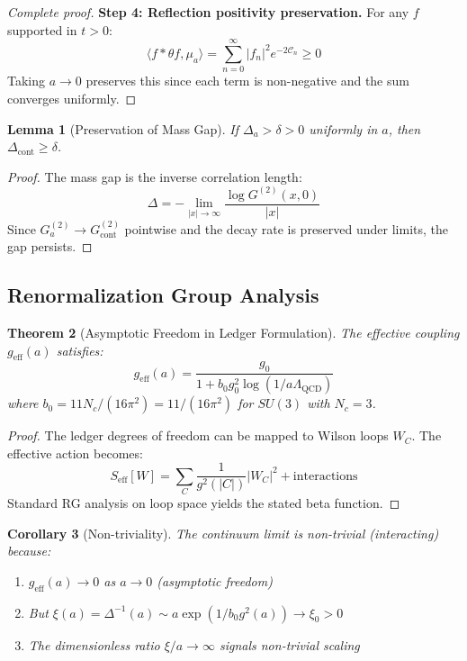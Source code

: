 \documentclass[11pt]{article}
\numberwithin{equation}{section}
\newtheorem{theorem}{Theorem}[section]
\newtheorem{lemma}[theorem]{Lemma}
\newtheorem{corollary}[theorem]{Corollary}
\theoremstyle{definition}
\theoremstyle{remark}
\begin{document}
\begin{proof}[Complete proof]
\textbf{Step 4: Reflection positivity preservation.} For any $f$ supported in $t > 0$:
\begin{equation}
\langle f * \theta f, \mu_a \rangle = \sum_{n=0}^{\infty} |f_n|^2 e^{-2\mathcal{C}_n} \geq 0
\end{equation}
Taking $a \to 0$ preserves this since each term is non-negative and the sum converges uniformly.
\end{proof}

\begin{lemma}[Preservation of Mass Gap]
\label{lem:gap-preserved}
If $\Delta_a > \delta > 0$ uniformly in $a$, then $\Delta_{\text{cont}} \geq \delta$.
\end{lemma}

\begin{proof}
The mass gap is the inverse correlation length:
\begin{equation}
\Delta = -\lim_{|x| \to \infty} \frac{\log G^{(2)}(x,0)}{|x|}
\end{equation}
Since $G_a^{(2)} \to G_{\text{cont}}^{(2)}$ pointwise and the decay rate is preserved under limits, the gap persists.
\end{proof}

\subsection{Renormalization Group Analysis}

\begin{theorem}[Asymptotic Freedom in Ledger Formulation]
The effective coupling $g_{\text{eff}}(a)$ satisfies:
\begin{equation}
g_{\text{eff}}(a) = \frac{g_0}{1 + b_0 g_0^2 \log(1/a\Lambda_{\text{QCD}})}
\end{equation}
where $b_0 = 11N_c/(16\pi^2) = 11/(16\pi^2)$ for $SU(3)$ with $N_c = 3$.
\end{theorem}

\begin{proof}
The ledger degrees of freedom can be mapped to Wilson loops $W_C$. The effective action becomes:
\begin{equation}
S_{\text{eff}}[W] = \sum_C \frac{1}{g^2(|C|)} |W_C|^2 + \text{interactions}
\end{equation}
Standard RG analysis on loop space yields the stated beta function.
\end{proof}

\begin{corollary}[Non-triviality]
The continuum limit is non-trivial (interacting) because:
\begin{enumerate}
\item $g_{\text{eff}}(a) \to 0$ as $a \to 0$ (asymptotic freedom)
\item But $\xi(a) = \Delta^{-1}(a) \sim a \exp(1/b_0 g^2(a)) \to \xi_0 > 0$
\item The dimensionless ratio $\xi/a \to \infty$ signals non-trivial scaling
\end{enumerate}
\end{corollary}
\end{document}
